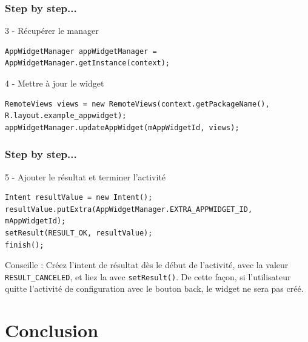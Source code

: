 \documentclass{beamer}
\begin{document}
\begin{frame}[fragile]
\frametitle{Step by step...}

\begin{block}{3 - Récupérer le manager}
\begin{lstlisting}
AppWidgetManager appWidgetManager = AppWidgetManager.getInstance(context);
\end{lstlisting}
\end{block}

\begin{block}{4 - Mettre à jour le widget}
\begin{lstlisting}
RemoteViews views = new RemoteViews(context.getPackageName(),
R.layout.example_appwidget);
appWidgetManager.updateAppWidget(mAppWidgetId, views);
\end{lstlisting}
\end{block}

\end{frame}

\begin{frame}[fragile]
\frametitle{Step by step...}

\begin{block}{5 - Ajouter le résultat et terminer l'activité}
\begin{lstlisting}
Intent resultValue = new Intent();
resultValue.putExtra(AppWidgetManager.EXTRA_APPWIDGET_ID, mAppWidgetId);
setResult(RESULT_OK, resultValue);
finish();
\end{lstlisting}
\end{block}

\begin{block}{Conseille :}
Créez l'intent de résultat dès le début de l'activité, avec la valeur \verb!RESULT_CANCELED!, et liez la avec \verb!setResult()!. De cette façon, si l'utilisateur quitte l'activité de configuration avec le bouton back, le widget ne sera pas créé.
\end{block}

\end{frame}


\section{Conclusion}
\end{document}
